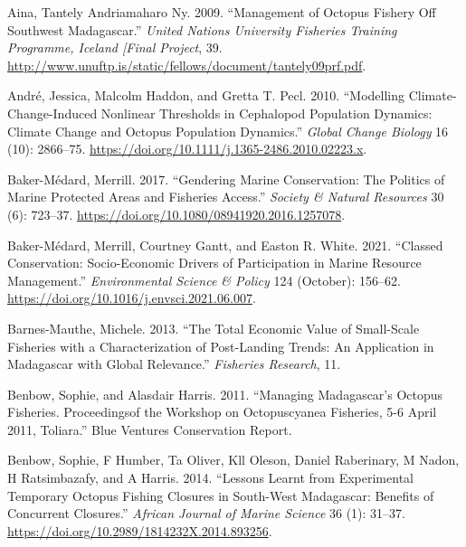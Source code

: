 \documentclass[
]{article}
\newlength{\cslhangindent}
\newlength{\cslentryspacingunit} %
\newenvironment{CSLReferences}[2] %
 {%
  \setlength{\parindent}{0pt}
  \ifodd #1
  \let\oldpar\par
  \def\par{\hangindent=\cslhangindent\oldpar}
  \fi
  \setlength{\parskip}{#2\cslentryspacingunit}
 }%
 {}
\begin{document}
\hypertarget{refs}{}
\begin{CSLReferences}{1}{0}
\leavevmode{}%
Aina, Tantely Andriamaharo Ny. 2009. {``Management of Octopus Fishery Off {Southwest} {Madagascar}.''} \emph{United Nations University Fisheries Training Programme, Iceland {[}Final Project}, 39. \url{http://www.unuftp.is/static/fellows/document/tantely09prf.pdf}.

\leavevmode{}%
André, Jessica, Malcolm Haddon, and Gretta T. Pecl. 2010. {``Modelling Climate-Change-Induced Nonlinear Thresholds in Cephalopod Population Dynamics: {Climate} Change and Octopus Population Dynamics.''} \emph{Global Change Biology} 16 (10): 2866--75. \url{https://doi.org/10.1111/j.1365-2486.2010.02223.x}.

\leavevmode{}%
Baker-Médard, Merrill. 2017. {``Gendering {Marine} {Conservation}: {The} {Politics} of {Marine} {Protected} {Areas} and {Fisheries} {Access}.''} \emph{Society \& Natural Resources} 30 (6): 723--37. \url{https://doi.org/10.1080/08941920.2016.1257078}.

\leavevmode{}%
Baker-Médard, Merrill, Courtney Gantt, and Easton R. White. 2021. {``Classed Conservation: {Socio}-Economic Drivers of Participation in Marine Resource Management.''} \emph{Environmental Science \& Policy} 124 (October): 156--62. \url{https://doi.org/10.1016/j.envsci.2021.06.007}.

\leavevmode{}%
Barnes-Mauthe, Michele. 2013. {``The Total Economic Value of Small-Scale Fisheries with a Characterization of Post-Landing Trends: {An} Application in {Madagascar} with Global Relevance.''} \emph{Fisheries Research}, 11.

\leavevmode{}%
Benbow, Sophie, and Alasdair Harris. 2011. {``Managing {Madagascar}'s Octopus Fisheries. {Proceedingsof} the Workshop on {Octopuscyanea} Fisheries, 5-6 {April} 2011, {Toliara}.''} Blue Ventures Conservation Report.

\leavevmode{}%
Benbow, Sophie, F Humber, Ta Oliver, Kll Oleson, Daniel Raberinary, M Nadon, H Ratsimbazafy, and A Harris. 2014. {``Lessons Learnt from Experimental Temporary Octopus Fishing Closures in South-West {Madagascar}: Benefits of Concurrent Closures.''} \emph{African Journal of Marine Science} 36 (1): 31--37. \url{https://doi.org/10.2989/1814232X.2014.893256}.


\end{CSLReferences}
\end{document}
